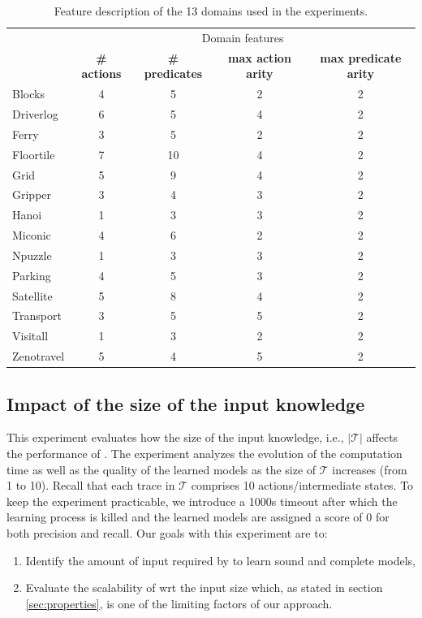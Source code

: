 \begin{table}[hbt!]
		\begin{center}
			\begin{tabular}{l|c|c|c|c|}	
				& \multicolumn{4}{c|}{Domain features}\\ \cline{2-5}
				 & {\bf \# actions} & {\bf \# predicates} & {\bf max action arity} & {\bf max predicate arity}  \\
				\hline
				Blocks & 4 & 5 & 2 & 2  \\
				Driverlog & 6 & 5 & 4 & 2  \\
				Ferry & 3 & 5 & 2 & 2  \\
				Floortile & 7 & 10 & 4 & 2  \\
				Grid & 5 & 9 & 4 & 2  \\
				Gripper & 3 & 4 & 3 & 2  \\
				Hanoi & 1 & 3 & 3 & 2  \\
				Miconic & 4 & 6 & 2 & 2  \\
				Npuzzle & 1 & 3 & 3 & 2  \\
				Parking & 4 & 5 & 3 & 2  \\
				Satellite & 5 & 8 & 4 & 2  \\
				Transport & 3 & 5 & 5 & 2  \\
				Visitall & 1 & 3 & 2 & 2  \\
				Zenotravel & 5 & 4 & 5 & 2
			\end{tabular}
		\end{center}
	\caption{\small Feature description of the 13 domains used in the experiments.}
	\label{tab:domain_features}	
\end{table}

\subsection{Impact of the size of the input knowledge}
This experiment evaluates how the size of the input knowledge, i.e., $\left|\mathcal{T}\right|$ affects the performance of \FAMA. The experiment analyzes the evolution of the computation time as well as the quality of the learned models as the size of $\mathcal{T}$ increases (from 1 to 10). Recall that each trace in $\mathcal{T}$ comprises 10 actions/intermediate states. To keep the experiment practicable, we introduce a 1000s timeout after which the learning process is killed and the learned models are assigned a score of 0 for both precision and recall. Our goals with this experiment are to:
\begin{enumerate}
	\item Identify the amount of input required by \FAMA to learn sound and complete models,
	\item Evaluate the scalability of \FAMA wrt the input size which, as stated in section \ref{sec:properties}, is one of the limiting factors of our approach.
\end{enumerate} 

